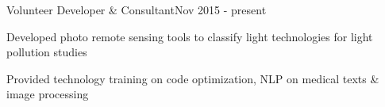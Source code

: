 \documentclass{article}
\newenvironment{**mylist}[2]{

\subsubsection*{#1\hfill#2}
  \small
  \begin{list}{}{}
    \setlength{\topsep}{0pt}
   \setlength{\itemsep}{1pt}
   \setlength{\parskip}{0pt}
   \setlength{\parsep}{0pt}}{\end{list}\normalsize}
\newcommand{\LU}[1]{\hspace{-1em}{\bf Technologies : #1}}
\def\PT{{\bf(Part Time)}\xspace}
\begin{document}
\begin{**mylist}{ \tabb Volunteer Developer \& Consultant}{Nov 2015 - present}
\item Developed photo remote sensing tools to classify light technologies for light pollution studies
\item Provided technology training on code optimization, NLP on medical texts \& image processing
\end{**mylist}

\begin{comment}
\begin{**mylist}{\censor{ComScore}
    \tabb Software Contractor}{June 2016 - Sept 2016}
\item Worked to support large, custom, memory mapped, data store for demographic analysis
\end{**mylist}
\end{comment}

\begin{comment}
\begin{**mylist}{\href{http://www.melinae.com/}{\censor{Melinae}} \PT \tabb Contractor}{March 2016}
\end{**mylist}
\end{comment}
\end{document}
